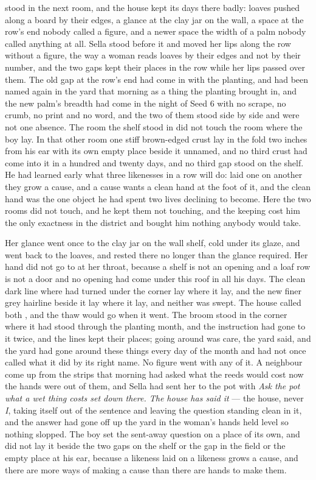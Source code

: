  stood in the next room, and the house kept its days there badly: loaves pushed along a board by their edges, a glance at the clay jar on the wall, a space at the row's end nobody called a figure, and a newer space the width of a palm nobody called anything at all. Sella stood before it and moved her lips along the row without a figure, the way a woman reads loaves by their edges and not by their number, and the two gaps kept their places in the row while her lips passed over them. The old gap at the row's end had come in with the planting, and had been named again in the yard that morning as a thing the planting brought in, and the new palm's breadth had come in the night of Seed 6 with no scrape, no crumb, no print and no word, and the two of them stood side by side and were not one absence. The room the shelf stood in did not touch the room where the boy lay. In that other room one stiff brown-edged crust lay in the fold two inches from his ear with its own empty place beside it unnamed, and no third crust had come into it in a hundred and twenty days, and no third gap stood on the shelf. He had learned early what three likenesses in a row will do: laid one on another they grow a cause, and a cause wants a clean hand at the foot of it, and the clean hand was the one object he had spent two lives declining to become. Here the two rooms did not touch, and he kept them not touching, and the keeping cost him the only exactness in the district and bought him nothing anybody would take.

Her glance went once to the clay jar on the wall shelf, cold under its glaze, and went back to the loaves, and rested there no longer than the glance required. Her hand did not go to  at her throat, because a shelf is not an opening and a loaf row is not a door and no opening had come under this roof in all his days. The clean dark line where  had turned under the corner lay where it lay, and the new finer grey hairline beside it lay where it lay, and neither was swept. The house called both , and the thaw would go when it went. The broom stood in the corner where it had stood through the planting month, and the instruction had gone to it twice, and the lines kept their places; going around was care, the yard said, and the yard had gone around these things every day of the month and had not once called what it did by its right name. No figure went with any of it. A neighbour come up from the strips that morning had asked what the reeds would cost now the hands were out of them, and Sella had sent her to the pot with \emph{Ask the pot what a wet thing costs set down there. The house has said it} --- the house, never \emph{I}, taking itself out of the sentence and leaving the question standing clean in it, and the answer had gone off up the yard in the woman's hands held level so nothing slopped. The boy set the sent-away question on a place of its own, and did not lay it beside the two gaps on the shelf or the gap in the field or the empty place at his ear, because a likeness laid on a likeness grows a cause, and there are more ways of making a cause than there are hands to make them.

